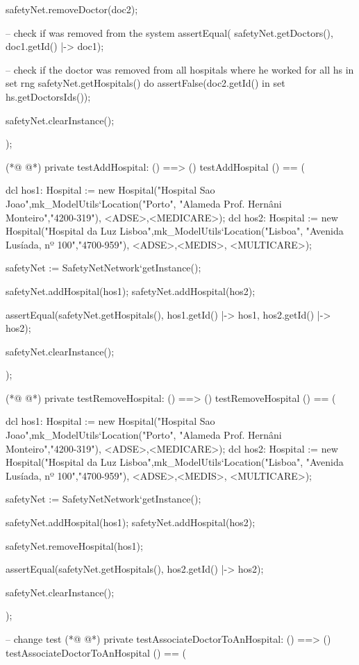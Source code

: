 \begin{vdmpp}[breaklines=true]
  safetyNet.removeDoctor(doc2);

  -- check if was removed from the system
  assertEqual( safetyNet.getDoctors(), {doc1.getId() |-> doc1});
  
  -- check if the doctor was removed from all hospitals where he worked
  for all hs in set rng safetyNet.getHospitals() do
   assertFalse(doc2.getId() in set hs.getDoctorsIds());
  
  safetyNet.clearInstance();
    
);

(*@
\label{testAddHospital:215}
@*)
private testAddHospital: () ==> ()
 testAddHospital () == (
  
  dcl hos1: Hospital := new Hospital("Hospital Sao Joao",mk_ModelUtils`Location("Porto", "Alameda Prof. Hernâni Monteiro","4200-319"), {<ADSE>,<MEDICARE>});
  dcl hos2: Hospital := new Hospital("Hospital da Luz Lisboa",mk_ModelUtils`Location("Lisboa", "Avenida Lusíada, nº 100","4700-959"), {<ADSE>,<MEDIS>, <MULTICARE>});
  
  safetyNet := SafetyNetNetwork`getInstance();
   
  safetyNet.addHospital(hos1);
  safetyNet.addHospital(hos2);
  
  assertEqual(safetyNet.getHospitals(), { hos1.getId() |-> hos1, hos2.getId() |-> hos2});
  
  safetyNet.clearInstance();
    
);

(*@
\label{testRemoveHospital:232}
@*)
private testRemoveHospital: () ==> ()
 testRemoveHospital () == (
  
  dcl hos1: Hospital := new Hospital("Hospital Sao Joao",mk_ModelUtils`Location("Porto", "Alameda Prof. Hernâni Monteiro","4200-319"), {<ADSE>,<MEDICARE>});
  dcl hos2: Hospital := new Hospital("Hospital da Luz Lisboa",mk_ModelUtils`Location("Lisboa", "Avenida Lusíada, nº 100","4700-959"), {<ADSE>,<MEDIS>, <MULTICARE>});
  
  safetyNet := SafetyNetNetwork`getInstance();
   
  safetyNet.addHospital(hos1);
  safetyNet.addHospital(hos2);

  safetyNet.removeHospital(hos1);

  assertEqual(safetyNet.getHospitals(), { hos2.getId() |-> hos2});
  
  safetyNet.clearInstance();
    
);

-- change test
(*@
\label{testAssociateDoctorToAnHospital:252}
@*)
private testAssociateDoctorToAnHospital: () ==> ()
 testAssociateDoctorToAnHospital () == (
 

\end{vdmpp}
